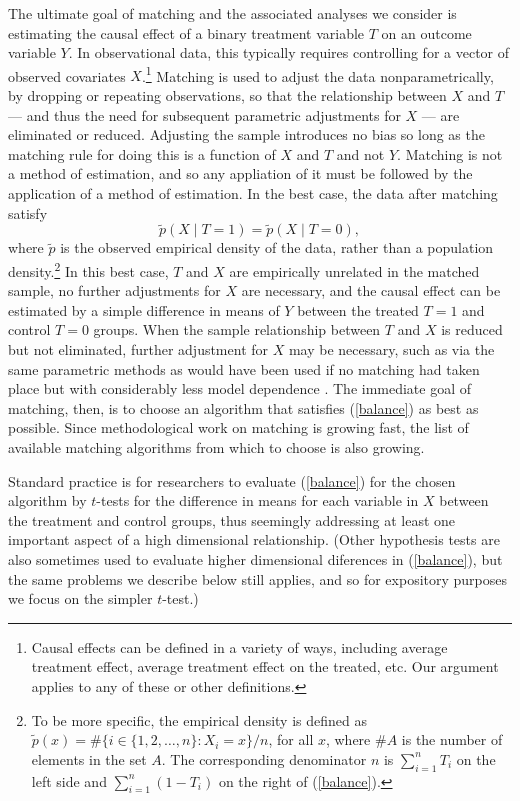 \documentclass[11pt,titlepage]{article}
\begin{document}
The ultimate goal of matching and the associated analyses
we consider is estimating the causal effect of a binary treatment
variable $T$ on an outcome variable $Y$.  In observational data, this
typically requires controlling for a vector of observed covariates
$X$.\footnote{Causal effects can be defined in a variety of ways,
  including average treatment effect, average treatment effect on the
  treated, etc.  Our argument applies to any of these or other
  definitions.}  Matching is used to adjust the data
nonparametrically, by dropping or repeating observations, so that the
relationship between $X$ and $T$ --- and thus the need for subsequent
parametric adjustments for $X$ --- are eliminated or reduced.
Adjusting the sample introduces no bias so long as the matching rule
for doing this is a function of $X$ and $T$ and not $Y$.  Matching is
not a method of estimation, and so any appliation of it must be
followed by the application of a method of estimation.  In the best
case, the data after matching satisfy
\begin{equation}
  \label{balance}
  \tilde p(X\mid T=1) = \tilde p(X\mid T=0),
\end{equation}
where $\tilde p$ is the observed empirical density of the data, rather
than a population density.\footnote{To be more specific, the empirical
  density is defined as $\tilde p(x) = \# \{ i\in \{1, 2, \dots, n \}:
  X_i = x \} / n$, for all $x$, where $\#A$ is the number of elements
  in the set $A$.  The corresponding denominator $n$ is $\sum_{i=1}^n
  T_i$ on the left side and $\sum_{i=1}^n (1-T_i)$ on the right of
  (\ref{balance}).} In this best case, $T$ and $X$ are empirically
unrelated in the matched sample, no further adjustments for $X$ are
necessary, and the causal effect can be estimated by a simple
difference in means of $Y$ between the treated $T=1$ and control $T=0$
groups.  When the sample relationship between $T$ and $X$ is reduced
but not eliminated, further adjustment for $X$ may be necessary, such
as via the same parametric methods as would have been used if no
matching had taken place but with considerably less model dependence
\citep{HoImaKin06}.  The immediate goal of matching, then, is to
choose an algorithm that satisfies (\ref{balance}) as best as
possible.  Since methodological work on matching is growing fast, the
list of available matching algorithms from which to choose is also
growing.

Standard practice is for researchers to evaluate (\ref{balance}) for
the chosen algorithm by $t$-tests for the difference in means for each
variable in $X$ between the treatment and control groups, thus
seemingly addressing at least one important aspect of a high
dimensional relationship.  (Other hypothesis tests are also sometimes
used to evaluate higher dimensional diferences in (\ref{balance}), but
the same problems we describe below still applies, and so for
expository purposes we focus on the simpler $t$-test.)  
\end{document}
